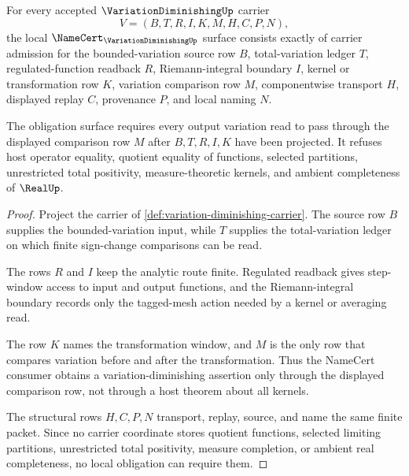 \begin{theorem}
\label{thm:variation-diminishing-namecert-obligations}
For every accepted $\VariationDiminishingUp$ carrier
$$
V=(B,T,R,I,K,M,H,C,P,N),
$$
the local $\NameCert_{\VariationDiminishingUp}$ surface consists exactly of carrier admission for the bounded-variation source row $B$, total-variation ledger $T$, regulated-function readback $R$, Riemann-integral boundary $I$, kernel or transformation row $K$, variation comparison row $M$, componentwise transport $H$, displayed replay $C$, provenance $P$, and local naming $N$.

The obligation surface requires every output variation read to pass through the displayed comparison row $M$ after $B,T,R,I,K$ have been projected. It refuses host operator equality, quotient equality of functions, selected partitions, unrestricted total positivity, measure-theoretic kernels, and ambient completeness of $\RealUp$.
\end{theorem}
\begin{proof}
Project the carrier of \autoref{def:variation-diminishing-carrier}. The source row $B$ supplies the bounded-variation input, while $T$ supplies the total-variation ledger on which finite sign-change comparisons can be read.

The rows $R$ and $I$ keep the analytic route finite. Regulated readback gives step-window access to input and output functions, and the Riemann-integral boundary records only the tagged-mesh action needed by a kernel or averaging read.

The row $K$ names the transformation window, and $M$ is the only row that compares variation before and after the transformation. Thus the NameCert consumer obtains a variation-diminishing assertion only through the displayed comparison row, not through a host theorem about all kernels.

The structural rows $H,C,P,N$ transport, replay, source, and name the same finite packet. Since no carrier coordinate stores quotient functions, selected limiting partitions, unrestricted total positivity, measure completion, or ambient real completeness, no local obligation can require them.
\end{proof}

